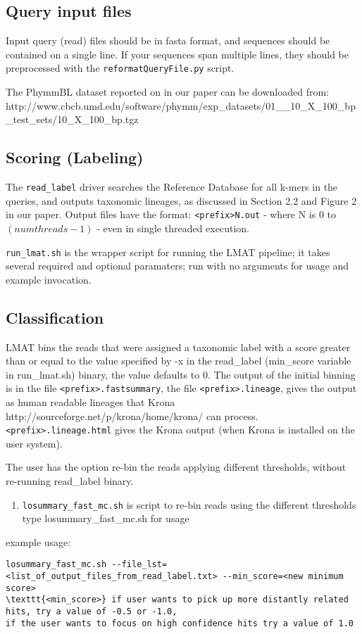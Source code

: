 \documentclass[11pt]{article}
\begin{document}
\subsection{Query input files}

Input query (read) files should be in fasta format, and sequences should
be contained on a single line. If your sequences span multiple lines,
they should be preprocessed with the \texttt{reformatQueryFile.py} script.

The PhymmBL dataset reported on in our paper can be downloaded from:\\
http://www.cbcb.umd.edu/software/phymm/exp\_datasets/01\_\_10\_X\_100\_bp\_test\_sets/10\_X\_100\_bp.tgz

\subsection{Scoring (Labeling)}

The \texttt{read\_label} driver searches the Reference Database for all k-mers 
in the queries, and outputs taxonomic lineages, as discussed in Section 2.2 and
Figure 2 in our paper.  Output files have the format: \texttt{<prefix>N.out} - where N is 0 to
$(numthreads-1)$ - even in single threaded execution. 

\texttt{run\_lmat.sh} is the wrapper script for running the LMAT pipeline; it takes several required 
and optional paramaters; run with no arguments for usage and example invocation.

\subsection{Classification}

LMAT bins the reads that were assigned a taxonomic label with a score greater than or equal to the value specified by -x in the read_label (min_score variable in run\_lmat.sh) binary, the value defaults to 0.
The output of the initial binning is in the file \texttt{<prefix>.fastsummary}, the file \texttt{<prefix>.lineage}, gives the output as human readable lineages that Krona {http://sourceforge.net/p/krona/home/krona/}
can process. \texttt{<prefix>.lineage.html} gives the Krona output (when Krona is installed on the user system).

The user has the option re-bin the reads applying different thresholds, without re-running read_label binary. 
\begin{enumerate}
\item
\texttt{losummary_fast_mc.sh} is script to re-bin reads using the different thresholds
type losummary_fast_mc.sh for usage
\end{enumerate}
example usage: 
\begin{verbatim}
losummary_fast_mc.sh --file_lst=<list_of_output_files_from_read_label.txt> --min_score=<new minimum score>
\texttt{<min_score>} if user wants to pick up more distantly related hits, try a value of -0.5 or -1.0,
if the user wants to focus on high confidence hits try a value of 1.0

\end{verbatim}
\end{document}
